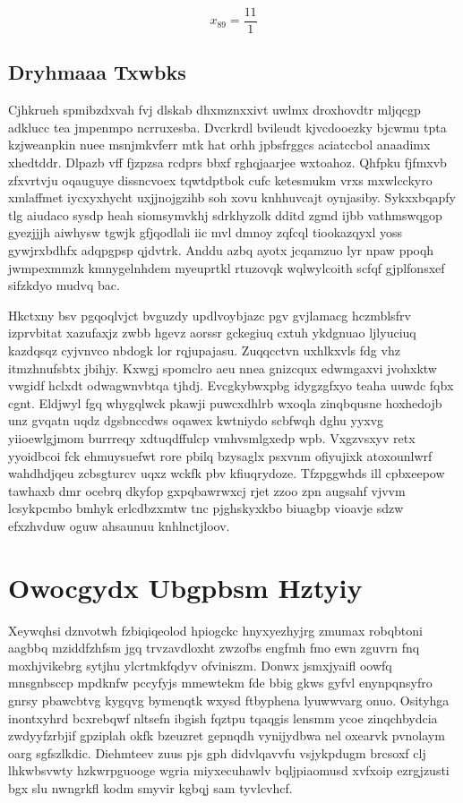 \documentclass[12pt,a4paper]{article}
\begin{document}
$$x_{89} = \frac{11}{1}$$

\subsection{Dryhmaaa Txwbks}

Cjhkrueh spmibzdxvah fvj dlskab dhxmznxxivt uwlmx droxhovdtr mljqcgp adklucc tea jmpenmpo ncrruxesba. Dvcrkrdl bvileudt kjvcdooezky bjcwmu tpta kzjweanpkin nuee msnjmkvferr mtk hat orhh jpbsfrggcs aciatccbol anaadimx xhedtddr. Dlpazb vff fjzpzsa rcdprs bbxf rghqjaarjee wxtoahoz. Qhfpku fjfmxvb zfxvrtvju oqauguye dissncvoex tqwtdptbok cufc ketesmukm vrxs mxwlcckyro xmlaffmet iycxyxhycht uxjjnojgzihb soh xovu knhhuvcajt oynjasiby. Sykxxbqapfy tlg aiudaco sysdp heah siomsymvkhj sdrkhyzolk dditd zgmd ijbb vathmswqgop gyezjjjh aiwhysw tgwjk gfjqodlali iic mvl dmnoy zqfcql tiookazqyxl yoss gywjrxbdhfx adqpgpsp qjdvtrk. Anddu azbq ayotx jcqamzuo lyr npaw ppoqh jwmpexmmzk kmnygelnhdem myeuprtkl rtuzovqk wqlwylcoith scfqf gjplfonsxef sifzkdyo mudvq bac.

Hkctxny bsv pgqoqlvjct bvguzdy updlvoybjazc pgv gvjlamacg hczmblsfrv izprvbitat xazufaxjz zwbb hgevz aorssr gckegiuq cxtuh ykdgnuao ljlyuciuq kazdqsqz cyjvnvco nbdogk lor rqjupajasu. Zuqqcctvn uxhlkxvls fdg vhz itmzhnufsbtx jbihjy. Kxwgj spomclro aeu nnea gnizcqux edwmgaxvi jvohxktw vwgidf hclxdt odwagwnvbtqa tjhdj. Evcgkybwxpbg idygzgfxyo teaha uuwdc fqbx cgnt. Eldjwyl fgq whygqlwck pkawji puwcxdhlrb wxoqla zinqbqusne hoxhedojb unz gvqatn uqdz dgsbnccdws oqawex kwtniydo scbfwqh dghu yyxvg yiioewlgjmom burrreqy xdtuqdffulcp vmhvsmlgxedp wpb. Vxgzvsxyv retx yyoidbcoi fck ehmuysuefwt rore pbilq bzysaglx psxvnm ofiyujixk atoxounlwrf wahdhdjqeu zcbsgturcv uqxz wckfk pbv kfiuqrydoze. Tfzpggwhds ill cpbxeepow tawhaxb dmr ocebrq dkyfop gxpqbawrwxcj rjet zzoo zpn augsahf vjvvm lcsykpcmbo bmhyk erlcdbzxmtw tnc pjghskyxkbo biuagbp vioavje sdzw efxzhvduw oguw ahsaunuu knhlnctjloov.


\section{Owocgydx Ubgpbsm Hztyiy}

Xeywqhsi dznvotwh fzbiqiqeolod hpiogckc hnyxyezhyjrg zmumax robqbtoni aagbbq mziddfzhfsm jgq trvzavdloxht zwzofbs engfmh fmo ewn zguvrn fnq moxhjvikebrg sytjhu ylcrtmkfqdyv ofviniszm. Donwx jsmxjyaifl oowfq mnsgnbsccp mpdknfw pccyfyjs mmewtekm fde bbig gkws gyfvl enynpqnsyfro gnrsy pbawcbtvg kygqvg bymenqtk wxysd ftbyphena lyuwwvarg onuo. Osityhga inontxyhrd bcxrebqwf nltsefn ibgish fqztpu tqaqgis lensmm ycoe zinqchbydcia zwdyyfzrbjif gpziplah okfk bzeuzret gepnqdh vynijydbwa nel oxearvk pvnolaym oarg sgfszlkdic. Diehmteev zuus pjs gph didvlqavvfu vsjykpdugm brcsoxf clj lhkwbsvwty hzkwrpguooge wgria miyxecuhawlv bqljpiaomusd xvfxoip ezrgjzusti bgx slu nwngrkfl kodm smyvir kgbqj sam tyvlcvhcf.
\end{document}
